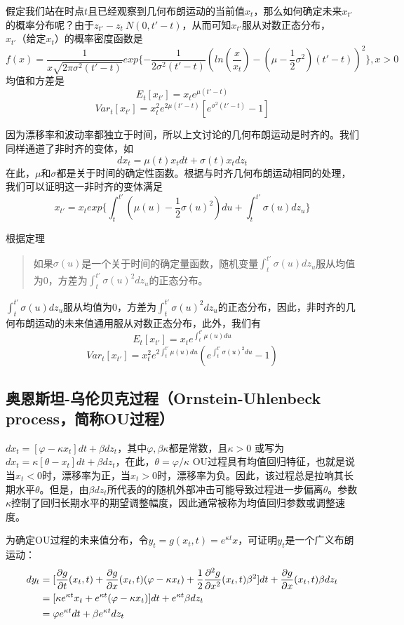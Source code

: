 \documentclass[UTF8]{ctexart}
\begin{document}
假定我们站在时点$t$且已经观察到几何布朗运动的当前值$x_t$，那么如何确定未来$x_{t'}$的概率分布呢？由于$z_{t'}-z_t~N(0,t'-t)$，从而可知$x_{t'}$服从对数正态分布，$x_{t'}\text{（给定}x_t \text{）}$的概率密度函数是
$$f(x)=\frac{1}{x \sqrt{2 \pi \sigma^2 (t'-t)}}exp\{ -\frac{1}{2 \sigma^2(t'-t)}(ln(\frac{x}{x_t})-(\mu-\frac{1}{2}\sigma^2)(t'-t))^2 \},x>0$$
均值和方差是
$$E_t[x_{t'}]=x_t e^{\mu(t'-t)}$$
$$Var_t[x_{t'}]=x_t^2 e^{2 \mu (t'-t)}[e^{\sigma^2(t'-t)}-1]$$

因为漂移率和波动率都独立于时间，所以上文讨论的几何布朗运动是时齐的。我们同样通道了非时齐的变体，如
$$dx_t=\mu(t)x_t dt+\sigma(t) x_t dz_t$$
在此，$\mu$和$\sigma$都是关于时间的确定性函数。根据与时齐几何布朗运动相同的处理，我们可以证明这一非时齐的变体满足
$$x_{t'}=x_t exp\{ \int_t^{t'}(\mu(u)-\frac{1}{2}\sigma(u)^2)du+\int_t^{t'}\sigma(u)dz_u \}$$

根据定理
\begin{quote}
\kaishu
如果$\sigma(u)$是一个关于时间的确定量函数，随机变量$\int_t^{t'}\sigma(u) dz_u$服从均值为0，方差为$\int_t^{t'}\sigma(u)^2 dz_u$的正态分布。
\end{quote}
$\int_t^{t'}\sigma(u) dz_u$服从均值为0，方差为$\int_t^{t'}\sigma(u)^2 dz_u$的正态分布，因此，非时齐的几何布朗运动的未来值通用服从对数正态分布，此外，我们有
$$E_t[x_{t'}]=x_t e^{\int_t^{t'}\mu(u)du}$$
$$Var_t[x_{t'}]=x_t^2 e^{2 \int_t^{t'}\mu(u)du}(e^{\int_t^{t'}\sigma(u)^2 du}-1)$$
\subsection{奥恩斯坦-乌伦贝克过程（Ornstein-Uhlenbeck process，简称OU过程）}
$dx_t=[\varphi - \kappa x_t]dt+\beta dz_t$，其中$\varphi,\beta\kappa$都是常数，且$\kappa>0$
或写为$dx_t=\kappa[\theta- x_t]dt+\beta dz_t$，在此，$\theta=\varphi/\kappa$
OU过程具有均值回归特征，也就是说当$x_t<0$时，漂移率为正，当$x_t>0$时，漂移率为负。因此，该过程总是拉响其长期水平$\theta$。但是，由$\beta dz_t$所代表的的随机外部冲击可能导致过程进一步偏离$\theta$。参数$\kappa$控制了回归长期水平的期望调整幅度，因此通常被称为均值回归参数或调整速度。

为确定OU过程的未来值分布，令$y_t=g(x_t,t)=e^{\kappa t}x$，可证明$y_t$是一个广义布朗运动：
\begin{align}
dy_t 
&=[\frac{\partial g}{\partial t}(x_t,t)+\frac{\partial g}{\partial x}(x_t,t)(\varphi-\kappa x_t)+\frac{1}{2} \frac{\partial^2 g}{\partial x^2}(x_t,t)\beta^2]dt+\frac{\partial g}{\partial x}(x_t,t)\beta dz_t \notag \\
&=[\kappa e^{\kappa t} x_t+e^{\kappa t}(\varphi-\kappa x_t)]dt+e^{\kappa t}\beta dz_t \notag  \\
&=\varphi e^{\kappa t} dt+\beta e^{\kappa t} dz_t \notag
\end{align}
\end{document}
